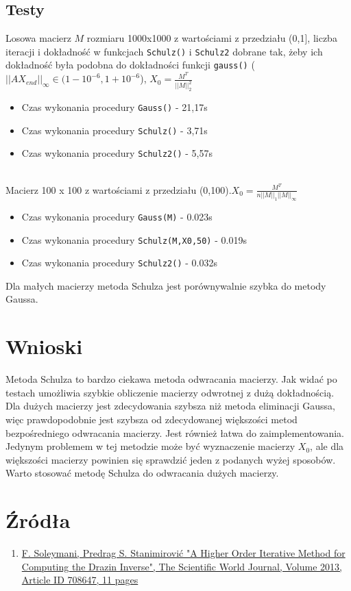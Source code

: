 \documentclass[11pt,a4paper]{article}
\begin{document}
    \subsection{Testy}
    Losowa macierz $M$ rozmiaru 1000x1000 z wartościami z przedziału (0,1], liczba iteracji i dokładność w funkcjach \verb!Schulz()! i \verb!Schulz2! dobrane tak, żeby ich dokładność była podobna do dokładności funkcji \verb!gauss()! ($||AX_{end}||_\infty \in (1-10^{-6}, 1+10^{-6}$), $X_0 = \frac{M^T}{||M||_2^2}$
    \begin{itemize}
        \item Czas wykonania procedury \verb!Gauss()! - 21,17s
        \item Czas wykonania procedury \verb!Schulz()! - 3,71s
        \item Czas wykonania procedury \verb!Schulz2()! - 5,57s\\\\
    \end{itemize}
    
    Macierz 100 x 100 z wartościami z przedziału (0,100).$X_0=\frac{M^T}{n||M||_1||M||_\infty}$
    \begin{itemize}
        \item Czas wykonania procedury \verb!Gauss(M)! - 0.023s
        \item Czas wykonania procedury \verb!Schulz(M,X0,50)! - 0.019s
        \item Czas wykonania procedury \verb!Schulz2()! - 0.032s
    \end{itemize}
    Dla małych macierzy metoda Schulza jest porównywalnie szybka do metody Gaussa.

    \section{Wnioski} 
    Metoda Schulza to bardzo ciekawa metoda odwracania macierzy. Jak widać po testach umożliwia szybkie obliczenie macierzy odwrotnej z dużą dokładnością. Dla dużych macierzy jest zdecydowania szybsza niż metoda eliminacji Gaussa, więc prawdopodobnie jest szybsza od zdecydowanej większości metod bezpośredniego odwracania macierzy. Jest również łatwa do zaimplementowania. Jedynym problemem w tej metodzie może być wyznaczenie macierzy $X_0$, ale dla większości macierzy powinien się sprawdzić jeden z podanych wyżej sposobów. Warto stosować metodę Schulza do odwracania dużych macierzy.
    \section{Źródła}
    \begin{enumerate}
        \item \href{https://www.hindawi.com/journals/tswj/2013/708647/}{F. Soleymani, Predrag S. Stanimirović "A Higher Order Iterative Method for Computing the Drazin Inverse", The Scientific World Journal, Volume 2013, Article ID 708647, 11 pages}
    \end{enumerate}
\end{document}
